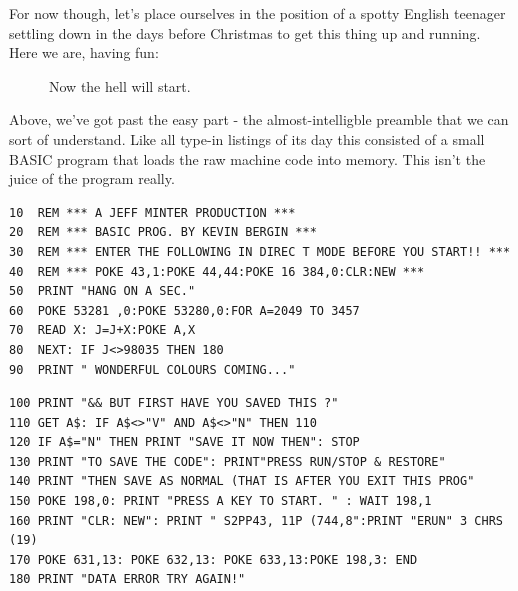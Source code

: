 For now though, let's place ourselves in the position of a spotty English teenager settling down in the days before Christmas to get
this thing up and running. Here we are, having fun: 

\begin{figure}[H]
    \centering
    \begin{adjustbox}{width=8cm,center}
    \end{adjustbox}
\caption*{Now the hell will start.}
\end{figure}

Above, we've got past the easy part - the almost-intelligble preamble that we can sort of understand.  Like all type-in listings of its day this consisted of a small BASIC program
that loads the raw machine code into memory. This isn't the juice of the program really.  

\lstset{style=C64BasicStyle}
\begin{lstlisting}[escapechar=\%]
10  REM *** A JEFF MINTER PRODUCTION ***
20  REM *** BASIC PROG. BY KEVIN BERGIN ***
30  REM *** ENTER THE FOLLOWING IN DIREC T MODE BEFORE YOU START!! ***
40  REM *** POKE 43,1:POKE 44,44:POKE 16 384,0:CLR:NEW ***
50  PRINT "HANG ON A SEC."
60  POKE 53281 ,0:POKE 53280,0:FOR A=2049 TO 3457
70  READ X: J=J+X:POKE A,X
80  NEXT: IF J<>98035 THEN 180
90  PRINT " WONDERFUL COLOURS COMING..."
\end{lstlisting}
\begin{lstlisting}[escapechar=\%]
100 PRINT "&& BUT FIRST HAVE YOU SAVED THIS ?"
110 GET A$: IF A$<>"V" AND A$<>"N" THEN 110
120 IF A$="N" THEN PRINT "SAVE IT NOW THEN": STOP
130 PRINT "TO SAVE THE CODE": PRINT"PRESS RUN/STOP & RESTORE"
140 PRINT "THEN SAVE AS NORMAL (THAT IS AFTER YOU EXIT THIS PROG"
150 POKE 198,0: PRINT "PRESS A KEY TO START. " : WAIT 198,1
160 PRINT "CLR: NEW": PRINT " S2PP43, 11P (744,8":PRINT "ERUN" 3 CHRS (19)
170 POKE 631,13: POKE 632,13: POKE 633,13:POKE 198,3: END
180 PRINT "DATA ERROR TRY AGAIN!"
\end{lstlisting}

